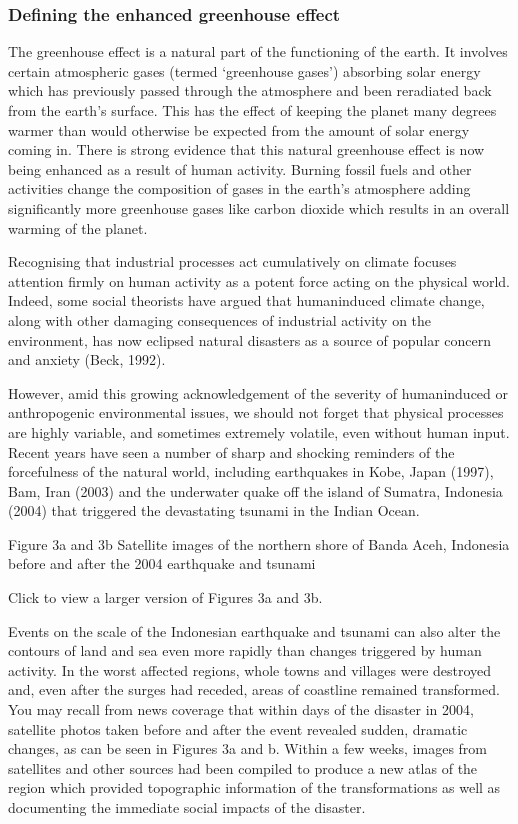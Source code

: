 \documentclass[letterpaper,10pt,english]{sphinxmanual}
\let\sphinxpxdimen\pdfpxdimen\else\newdimen\sphinxpxdimen
\begin{document}
\subsubsection{Defining the enhanced greenhouse effect}
\label{\detokenize{content/session_00/Part_00_01:Defining-the-enhanced-greenhouse-effect}}
The greenhouse effect is a natural part of the functioning of the earth. It involves certain atmospheric gases (termed ‘greenhouse gases’) absorbing solar energy which has previously passed through the atmosphere and been reradiated back from the earth’s surface. This has the effect of keeping the planet many degrees warmer than would otherwise be expected from the amount of solar energy coming in. There is strong evidence that this natural greenhouse effect is now being enhanced as a result of
human activity. Burning fossil fuels and other activities change the composition of gases in the earth’s atmosphere \textendash{} adding significantly more greenhouse gases like carbon dioxide \textendash{} which results in an overall warming of the planet.

Recognising that industrial processes act cumulatively on climate focuses attention firmly on human activity as a potent force acting on the physical world. Indeed, some social theorists have argued that human\sphinxhyphen{}induced climate change, along with other damaging consequences of industrial activity on the environment, has now eclipsed natural disasters as a source of popular concern and anxiety (Beck, 1992).

However, amid this growing acknowledgement of the severity of human\sphinxhyphen{}induced or anthropogenic environmental issues, we should not forget that physical processes are highly variable, and sometimes extremely volatile, even without human input. Recent years have seen a number of sharp and shocking reminders of the forcefulness of the natural world, including earthquakes in Kobe, Japan (1997), Bam, Iran (2003) and the underwater quake off the island of Sumatra, Indonesia (2004) that triggered the
devastating tsunami in the Indian Ocean.

\sphinxincludegraphics[width=570\sphinxpxdimen,height=714\sphinxpxdimen]{{dd205_3_003i}.jpg}

Figure 3a and 3b Satellite images of the northern shore of Banda Aceh, Indonesia before and after the 2004 earthquake and tsunami

Click to view a larger version of Figures 3a and 3b.

Events on the scale of the Indonesian earthquake and tsunami can also alter the contours of land and sea \textendash{} even more rapidly than changes triggered by human activity. In the worst affected regions, whole towns and villages were destroyed and, even after the surges had receded, areas of coastline remained transformed. You may recall from news coverage that within days of the disaster in 2004, satellite photos taken before and after the event revealed sudden, dramatic changes, as can be seen in
Figures 3a and b. Within a few weeks, images from satellites and other sources had been compiled to produce a new atlas of the region which provided topographic information of the transformations as well as documenting the immediate social impacts of the disaster.
\end{document}
